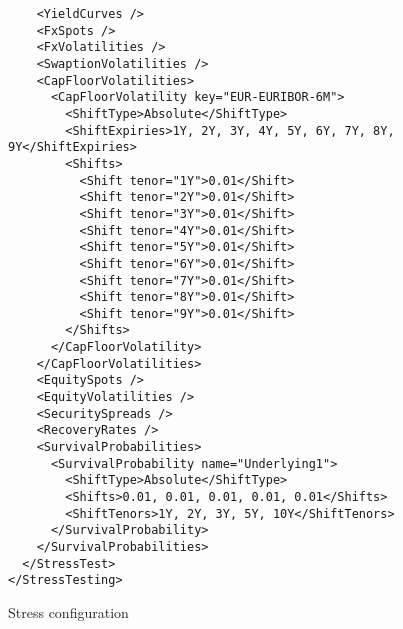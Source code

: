 \begin{longlisting}
\begin{verbatim}
    <YieldCurves />
    <FxSpots />
    <FxVolatilities />
    <SwaptionVolatilities />
    <CapFloorVolatilities>
      <CapFloorVolatility key="EUR-EURIBOR-6M">
        <ShiftType>Absolute</ShiftType>
        <ShiftExpiries>1Y, 2Y, 3Y, 4Y, 5Y, 6Y, 7Y, 8Y, 9Y</ShiftExpiries>
        <Shifts>
          <Shift tenor="1Y">0.01</Shift>
          <Shift tenor="2Y">0.01</Shift>
          <Shift tenor="3Y">0.01</Shift>
          <Shift tenor="4Y">0.01</Shift>
          <Shift tenor="5Y">0.01</Shift>
          <Shift tenor="6Y">0.01</Shift>
          <Shift tenor="7Y">0.01</Shift>
          <Shift tenor="8Y">0.01</Shift>
          <Shift tenor="9Y">0.01</Shift>
        </Shifts>
      </CapFloorVolatility>
    </CapFloorVolatilities>
    <EquitySpots />
    <EquityVolatilities />
    <SecuritySpreads />
    <RecoveryRates />
    <SurvivalProbabilities>
      <SurvivalProbability name="Underlying1">
        <ShiftType>Absolute</ShiftType>
        <Shifts>0.01, 0.01, 0.01, 0.01, 0.01</Shifts>
        <ShiftTenors>1Y, 2Y, 3Y, 5Y, 10Y</ShiftTenors>
      </SurvivalProbability>
    </SurvivalProbabilities>
  </StressTest>
</StressTesting>
  \end{verbatim}
\caption{Stress configuration}
\label{lst:stress_config}
\end{longlisting}
